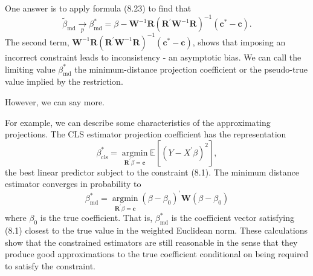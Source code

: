 \documentclass[10pt]{article}
\begin{document}
One answer is to apply formula (8.23) to find that
$$
\widetilde{\beta}_{\mathrm{md}} \underset{p}{\rightarrow} \beta_{\mathrm{md}}^{*}=\beta-\boldsymbol{W}^{-1} \boldsymbol{R}\left(\boldsymbol{R}^{\prime} \boldsymbol{W}^{-1} \boldsymbol{R}\right)^{-1}\left(\boldsymbol{c}^{*}-\boldsymbol{c}\right) .
$$
The second term, $\boldsymbol{W}^{-1} \boldsymbol{R}\left(\boldsymbol{R}^{\prime} \boldsymbol{W}^{-1} \boldsymbol{R}\right)^{-1}\left(\boldsymbol{c}^{*}-\boldsymbol{c}\right)$, shows that imposing an incorrect constraint leads to inconsistency - an asymptotic bias. We can call the limiting value $\beta_{\mathrm{md}}^{*}$ the minimum-distance projection coefficient or the pseudo-true value implied by the restriction.

However, we can say more.

For example, we can describe some characteristics of the approximating projections. The CLS estimator projection coefficient has the representation
$$
\beta_{\mathrm{cls}}^{*}=\underset{\boldsymbol{R}^{\prime} \beta=\boldsymbol{c}}{\operatorname{argmin}} \mathbb{E}\left[\left(Y-X^{\prime} \beta\right)^{2}\right],
$$
the best linear predictor subject to the constraint (8.1). The minimum distance estimator converges in probability to
$$
\beta_{\mathrm{md}}^{*}=\underset{\boldsymbol{R}^{\prime} \beta=\boldsymbol{c}}{\operatorname{argmin}}\left(\beta-\beta_{0}\right)^{\prime} \boldsymbol{W}\left(\beta-\beta_{0}\right)
$$
where $\beta_{0}$ is the true coefficient. That is, $\beta_{\mathrm{md}}^{*}$ is the coefficient vector satisfying (8.1) closest to the true value in the weighted Euclidean norm. These calculations show that the constrained estimators are still reasonable in the sense that they produce good approximations to the true coefficient conditional on being required to satisfy the constraint.
\end{document}
